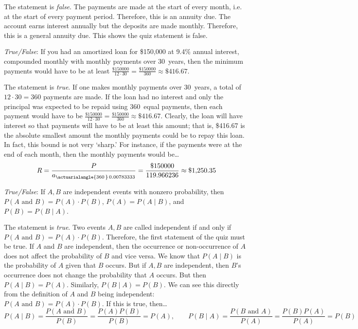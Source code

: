 \documentclass[11pt,letterpaper]{article}
\begin{document}
\sol The statement is \textit{false}. The payments are made at the start of every month, i.e. at the start of every payment period. Therefore, this is an annuity due. The account earns interest annually but the deposits are made monthly. Therefore, this is a general annuity due. This shows the quiz statement is false. \pvspace{1.1cm}



\quizsol \textit{True/False}: If you had an amortized loan for \$150,000 at 9.4\% annual interest, compounded monthly with monthly payments over 30~years, then the minimum payments would have to be at least $\frac{\$150000}{12 \cdot 30}= \frac{\$150000}{360} \approx \$416.67$. \pspace

\sol The statement is \textit{true}. If one makes monthly payments over 30~years, a total of $12 \cdot 30= 360$ payments are made. If the loan had no interest and only the principal was expected to be repaid using 360~equal payments, then each payment would have to be $\frac{\$150000}{12 \cdot 30}= \frac{\$150000}{360} \approx \$416.67$. Clearly, the loan will have interest so that payments will have to be at least this amount; that is, \$416.67 is the absolute smallest amount the monthly payments could be to repay this loan. In fact, this bound is not very `sharp.' For instance, if the payments were at the end of each month, then the monthly payments would be\dots
	\[
	R= \dfrac{P}{a_{\actuarialangle{360\,}\, 0.00783333}}= \dfrac{\$150000}{119.966236} \approx \$1,\!250.35
	\]



\newpage



\quizsol \textit{True/False}: If $A, B$ are independent events with nonzero probability, then $P(A \text{ and } B)= P(A) \cdot P(B)$, $P(A)= P(A \;|\; B)$, and $P(B)= P(B \;|\; A)$. \pspace

\sol The statement is \textit{true}. Two events $A, B$ are called independent if and only if $P(A \text{ and } B)= P(A) \cdot P(B)$. Therefore, the first statement of the quiz must be true. If $A$ and $B$ are independent, then the occurrence or non-occurrence of $A$ does not affect the probability of $B$ and vice versa. We know that $P(A \;|\; B)$ is the probability of $A$ given that $B$ occurs. But if $A, B$ are independent, then $B$'s occurrence does not change the probability that $A$ occurs. But then $P(A \;|\; B)= P(A)$. Similarly, $P(B \;|\; A)= P(B)$. We can see this directly from the definition of $A$ and $B$ being independent: $P(A \text{ and } B)= P(A) \cdot P(B)$. If this is true, then\dots
	\[
	P(A \;|\; B)= \dfrac{P(A \text{ and } B)}{P(B)}= \dfrac{P(A) P(B)}{P(B)}= P(A), \qquad P(B \;|\; A)= \dfrac{P(B \text{ and } A)}{P(A)}= \dfrac{P(B) P(A)}{P(A)}= P(B)
	\] \pvspace{1.3cm}
\end{document}

